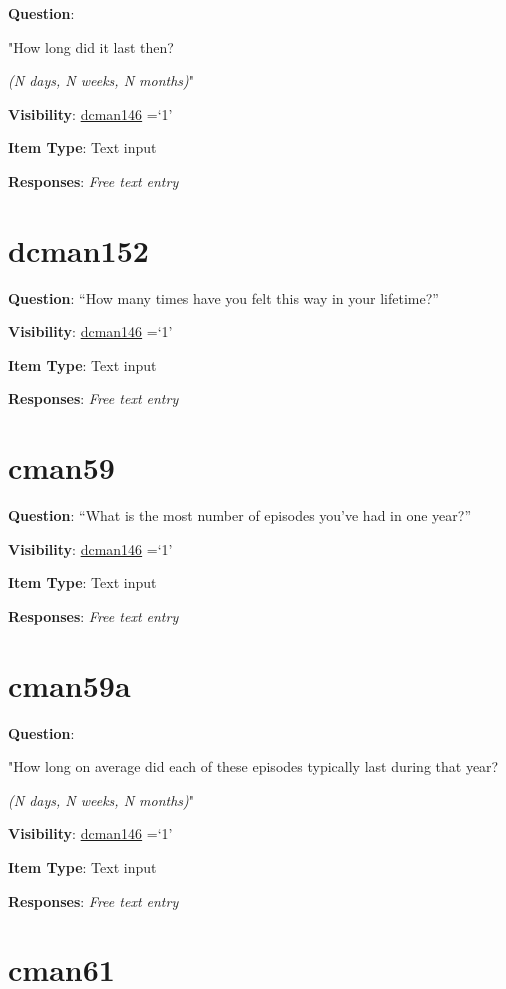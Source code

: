 \documentclass[]{book}
\begin{document}
\textbf{Question}:

"How long did it last then?

\emph{(N days, N weeks, N months)}"

\textbf{Visibility}: \protect\hyperlink{dcman146}{dcman146} =`1'

\textbf{Item Type}: Text input

\textbf{Responses}: \emph{Free text entry}

\hypertarget{dcman152}{%
\section{dcman152}\label{dcman152}}

\textbf{Question}: ``How many times have you felt this way in your lifetime?''

\textbf{Visibility}: \protect\hyperlink{dcman146}{dcman146} =`1'

\textbf{Item Type}: Text input

\textbf{Responses}: \emph{Free text entry}

\hypertarget{cman59}{%
\section{cman59}\label{cman59}}

\textbf{Question}: ``What is the most number of episodes you've had in one year?''

\textbf{Visibility}: \protect\hyperlink{dcman146}{dcman146} =`1'

\textbf{Item Type}: Text input

\textbf{Responses}: \emph{Free text entry}

\hypertarget{cman59a}{%
\section{cman59a}\label{cman59a}}

\textbf{Question}:

"How long on average did each of these episodes typically last during that year?

\emph{(N days, N weeks, N months)}"

\textbf{Visibility}: \protect\hyperlink{dcman146}{dcman146} =`1'

\textbf{Item Type}: Text input

\textbf{Responses}: \emph{Free text entry}

\hypertarget{cman61}{%
\section{cman61}\label{cman61}}
\end{document}
